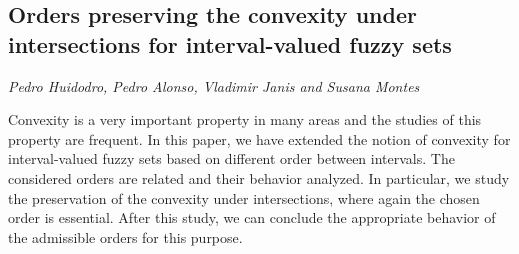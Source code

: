 \documentclass[../booklet.tex]{subfiles}
\begin{document}
\subsection[Orders preserving the convexity under intersections for interval-valued fuzzy sets. {\it Pedro Huidodro, Pedro Alonso, Vladimir Janis and Susana Montes}]{Orders preserving the convexity under intersections for interval-valued fuzzy sets}
   

\begin{center}
  {\it Pedro Huidodro, Pedro Alonso, Vladimir Janis and Susana Montes}
\end{center}

\vskip 0.8cm


Convexity is a very important property in many areas and the studies of this property are frequent. In this paper, we have extended the notion of convexity for interval-valued fuzzy sets based on different order between intervals. The considered orders are related and their behavior analyzed. In particular, we study the preservation of the convexity under intersections, where again the chosen order is essential. After this study, we can conclude the appropriate behavior of the admissible orders for this purpose.

\end{document}
